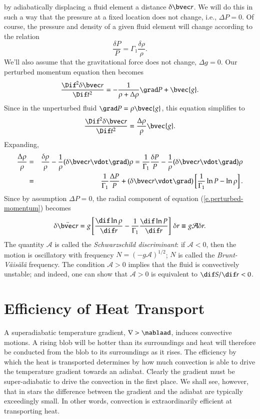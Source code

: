  by adiabatically displacing a fluid element a distance $\delta\vr$.  We will do this in such a way that the pressure at a fixed location does not change, i.e., $\Delta P = 0$. Of course, the pressure and density of a given fluid element will change according to the relation
\[
\frac{\delta P}{P} = \Gamma_{1}\frac{\delta\rho}{\rho}.
\]
We'll also assume that the gravitational force does not change, $\Delta g = 0$.  Our perturbed momentum equation then becomes
\[
\frac{\Dif^{2}\delta\vr}{\Dif t^{2}} = -\frac{1}{\rho + \Delta \rho}\grad P+ \bvec{g}.
\]
Since in the unperturbed fluid $\grad P = \rho\bvec{g}$, this equation simplifies to
\begin{equation}\label{e.perturbed-momentum}
\frac{\Dif^{2}\delta\vr}{\Dif t^{2}} = \frac{\Delta \rho}{\rho}\bvec{g}.
\end{equation}
Expanding,
\begin{eqnarray*}
\frac{\Delta \rho}{\rho} &=& \frac{\delta \rho}{\rho} - \frac{1}{\rho}(\delta\vr\vdot\grad)\rho = \frac{1}{\Gamma_{1}}\frac{\delta P}{P} - \frac{1}{\rho}(\delta\vr\vdot\grad)\rho\\
 &=& \frac{1}{\Gamma_{1}}\frac{\Delta P}{P} + (\delta\vr\vdot\grad)\left[\frac{1}{\Gamma_{1}}\ln P-\ln \rho\right].
\end{eqnarray*}
Since by assumption $\Delta P = 0$, the radial component of equation (\ref{e.perturbed-momentum}) becomes
\begin{equation}\label{e.blob-eq-of-motion}
\delta\ddot{\vr} = g\left[ \frac{\dif\ln\rho}{\dif r} - \frac{1}{\Gamma_{1}}\frac{\dif\ln P}{\dif r} \right] \,\delta r 
	\equiv g \mathcal{A} \delta r.
\end{equation}
The quantity $\mathcal{A}$ is called the \emph{Schwarzschild discriminant}: if $\mathcal{A} < 0$, then the motion is oscillatory with frequency $N = (-g\mathcal{A})^{1/2}$; $N$ is called the \emph{Brunt-V\"ais\"al\"a} frequency. The condition $\mathcal{A} > 0$ implies that the fluid is convectively unstable; and indeed, one can show that $\mathcal{A} > 0$ is equivalent to $\dif S/\dif r < 0$.

\section{Efficiency of Heat Transport}\label{s.efficiency-convection}

A superadiabatic temperature gradient, $\nabla > \nablaad$, induces convective motions. A rising blob will be hotter than its surroundings and heat will therefore be conducted from the blob to its surroundings as it rises. The efficiency by which the heat is transported determines by how much convection is able to drive the temperature gradient towards an adiabat. Clearly the gradient must be super-adiabatic to drive the convection in the first place. We shall see, however, that in stars the difference between the gradient and the adiabat are typically exceedingly small. In other words, convection is extraordinarily efficient at transporting heat.

